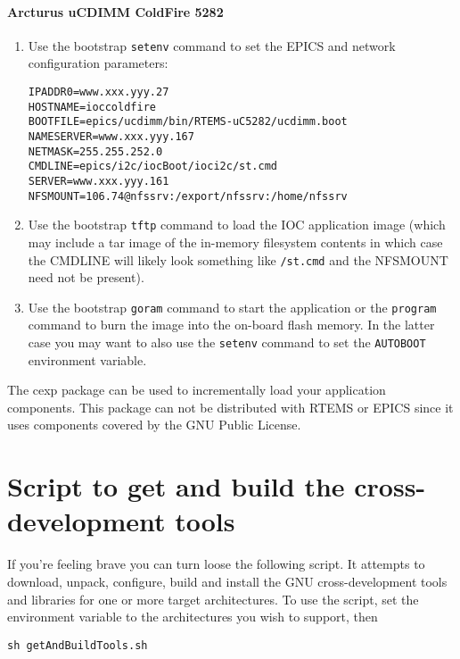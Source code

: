 \documentclass{report}
\begin{document}
\subsubsection{Arcturus uCDIMM ColdFire 5282}
\begin{enumerate}
\item Use the bootstrap {\tt setenv} command to set the EPICS and network
configuration parameters:
\begin{verbatim}
IPADDR0=www.xxx.yyy.27
HOSTNAME=ioccoldfire
BOOTFILE=epics/ucdimm/bin/RTEMS-uC5282/ucdimm.boot
NAMESERVER=www.xxx.yyy.167
NETMASK=255.255.252.0
CMDLINE=epics/i2c/iocBoot/ioci2c/st.cmd
SERVER=www.xxx.yyy.161
NFSMOUNT=106.74@nfssrv:/export/nfssrv:/home/nfssrv
\end{verbatim}
\item Use the bootstrap {\tt tftp} command to load the IOC application image
(which may include a tar image of the in-memory filesystem contents in which case the CMDLINE will likely look something like {\tt /st.cmd} and the NFSMOUNT need not be present).
\item Use the bootstrap {\tt goram} command to start the application or the
{\tt program} command to burn the image into the on-board flash memory.  In
the latter case you may want to also use the {\tt setenv} command to set the
{\tt AUTOBOOT} environment variable.
\end{enumerate}

The cexp package can be used to
incrementally load your application components.  This package can not
be distributed with RTEMS or EPICS since it uses components covered by
the GNU Public License.


\appendix
\chapter{Script to get and build the cross-development tools}
\label{getAndBuildTools}
If you're feeling brave you can turn loose the following script.  It attempts
to download, unpack, configure, build and install the GNU cross-development
tools and libraries for one or more target architectures.  To use
the script, set the \verb@ARCHS@ 
environment variable to the architectures you wish to support, then 
\begin{verbatim}
sh getAndBuildTools.sh
\end{verbatim}
\end{document}
